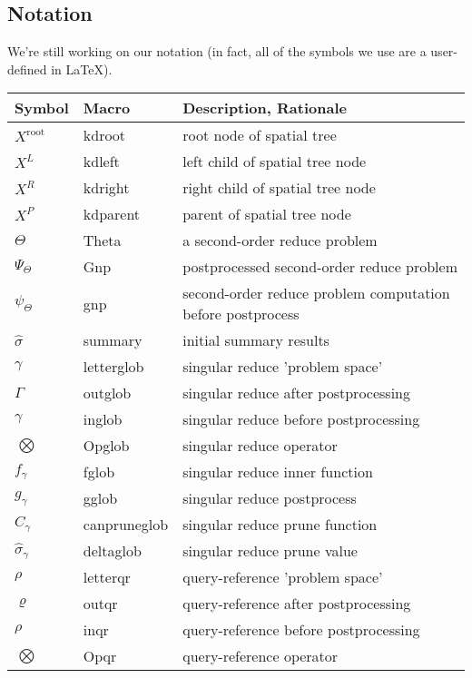 \documentclass[times, leqno,twocolumn]{article}
\newcommand{\summary}{\hat{\sigma}}
\newcommand{\Gnp}{\Psi_{\Theta}}
\newcommand{\gnp}{\psi_{\Theta}}
\newcommand{\kdroot}[1]{#1^{\text{root}}}
\newcommand{\kdleft}[1]{#1^{\!L}}
\newcommand{\kdright}[1]{#1^{\!R}}
\newcommand{\kdparent}[1]{#1^{\!P}}
\newcommand{\nameOp}[2]{\mathop{#1\nolimits\!\!_{#2}}}
\newcommand{\myOp}[1]{\nameOp{\bigotimes}{#1}}
\newcommand{\letterglob}{\gamma}
\newcommand{\outglob}{\Gamma}
\newcommand{\inglob}{\gamma}
\newcommand{\Opglob}{\myOp{\letterglob}}
\newcommand{\fglob}{f_{\!\letterglob}}
\newcommand{\gglob}{g_{\!\letterglob}}
\newcommand{\canpruneglob}{C_{\!\letterglob}}
\newcommand{\deltaglob}{\summary_{\!\letterglob}}
\newcommand{\letterqr}{\rho}
\newcommand{\outqr}{\varrho}
\newcommand{\inqr}{\rho}
\newcommand{\Opqr}{\myOp{\letterqr}}
\begin{document}
\begin{appendix}

\section{Notation}

We're still working on our notation (in fact, all of the symbols we use are a user-defined in LaTeX).

\begin{table*}
\begin{tabular}{|l|l|l|}
\hline
Symbol & Macro & Description, Rationale
\\ \hline $\kdroot{X}$ & kdroot & root node of spatial tree
\\ $\kdleft{X}$ & kdleft & left child of spatial tree node
\\ $\kdright{X}$ & kdright & right child of spatial tree node
\\ $\kdparent{X}$ & kdparent & parent of spatial tree node
\\ \hline $\Theta$ & Theta & a second-order reduce problem
\\ $\Gnp$ & Gnp & postprocessed second-order reduce problem
\\ $\gnp$ & gnp & second-order reduce problem computation before postprocess
\\ $\summary$ & summary & initial summary results
\\ \hline $\letterglob$ & letterglob & singular reduce 'problem space'
\\ $\outglob$ & outglob & singular reduce after postprocessing
\\ $\inglob$ & inglob & singular reduce before postprocessing
\\ $\Opglob$ & Opglob & singular reduce operator
\\ $\fglob$ & fglob & singular reduce inner function
\\ $\gglob$ & gglob & singular reduce postprocess
\\ $\canpruneglob$ & canpruneglob & singular reduce prune function
\\ $\deltaglob$ & deltaglob & singular reduce prune value
\\ \hline $\letterqr$ & letterqr & query-reference 'problem space'
\\ $\outqr$ & outqr & query-reference after postprocessing
\\ $\inqr$ & inqr & query-reference before postprocessing
\\ $\Opqr$ & Opqr & query-reference operator

\end{tabular}
\end{table*}
\end{appendix}
\end{document}
